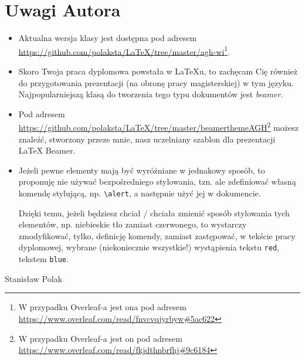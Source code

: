 \chapter{Uwagi Autora}
\begin{itemize}
     \item Aktualna wersja klasy jest dostępna pod adresem \url{https://github.com/polaksta/LaTeX/tree/master/agh-wi}\footnote{W przypadku Overleaf-a jest ona pod adresem  \url{https://www.overleaf.com/read/fnvcvqjyrbyw\#5ac622}}.
    \item Skoro Twoja praca dyplomowa powstała w \LaTeX{}u, to zachęcam Cię również do przygotowania prezentacji (na obronę pracy magisterskiej) w tym języku. Najpopularniejszą klasą do tworzenia tego typu dokumentów jest \emph{beamer}.
    \item Pod adresem \url{https://github.com/polaksta/LaTeX/tree/master/beamerthemeAGH}\footnote{W przypadku Overleaf-a jest on pod adresem  \url{https://www.overleaf.com/read/fkjdthnbrfhj\#9c6184}} możesz znaleźć, stworzony przeze mnie,  nasz uczelniany szablon dla prezentacji \LaTeX{} Beamer.
    \item Jeżeli pewne elementy mają być wyróżniane w \alert{jednakowy} \alert{sposób}, to proponuję nie używać bezpośredniego stylowania, tzn.
           ale zdefiniować własną komendę stylującą, np. \verb+\alert+,
          a następnie użyć jej w dokumencie.

          Dzięki temu, jeżeli będziesz chciał / chciała zmienić sposób stylowania tych elementów, np. niebieskie tło zamiast czerwonego, to wystarczy zmodyfikować, tylko, definicję komendy, zamiast zastępować, w tekście pracy dyplomowej, wybrane (niekoniecznie wszystkie!) wystąpienia tekstu \texttt{red}, tekstem \texttt{blue}.
\end{itemize}
Stanisław Polak
